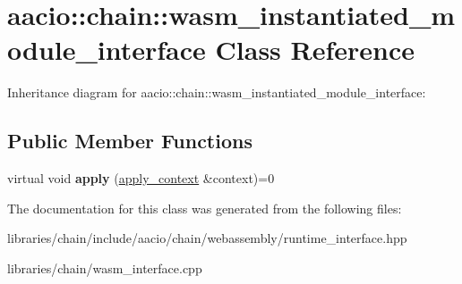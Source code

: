 \hypertarget{classaacio_1_1chain_1_1wasm__instantiated__module__interface}{}\section{aacio\+:\+:chain\+:\+:wasm\+\_\+instantiated\+\_\+module\+\_\+interface Class Reference}
\label{classaacio_1_1chain_1_1wasm__instantiated__module__interface}


Inheritance diagram for aacio\+:\+:chain\+:\+:wasm\+\_\+instantiated\+\_\+module\+\_\+interface\+:
\subsection*{Public Member Functions}
\begin{DoxyCompactItemize}
\item 
\mbox{\label{classaacio_1_1chain_1_1wasm__instantiated__module__interface_ad042b2518248389a73ec36e9417c82ea}} 
virtual void {\bfseries apply} (\mbox{\hyperlink{classaacio_1_1chain_1_1apply__context}{apply\+\_\+context}} \&context)=0
\end{DoxyCompactItemize}


The documentation for this class was generated from the following files\+:\begin{DoxyCompactItemize}
\item 
libraries/chain/include/aacio/chain/webassembly/runtime\+\_\+interface.\+hpp\item 
libraries/chain/wasm\+\_\+interface.\+cpp\end{DoxyCompactItemize}
